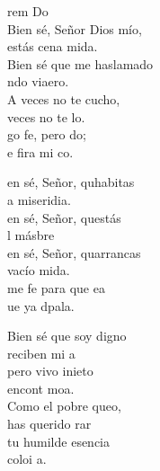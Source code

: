 \begin{cancion}%
rem            Do 	 \\
Bien sé, Señor Dios mío, \\
	 estás cena mida.\\
	Bien sé que me haslamado \\
	ndo viaero.\\
	\jump
	A veces no te cucho, \\
	veces no te lo.\\
	go fe, pero do; \\
	e fira mi co.   \jump\\
	\begin{chorus}%
		en sé, Señor, quhabitas \\
		a miseridia.  \\
		en sé, Señor, questás\\
		l másbre \\
		en sé, Señor, quarrancas\\
		vacío mida.  \\
		me fe para que ea\\
		ue ya  dpala.\jump\\
	\end{chorus}%
	Bien sé que soy digno \\
	reciben mi a\\
	pero vivo inieto\\
	 encont  moa.\\
	\jump
	Como el pobre queo, \\
	 has querido rar\\
	 tu humilde esencia \\
	 coloi a.  \\
	\jump
\end{cancion}%
